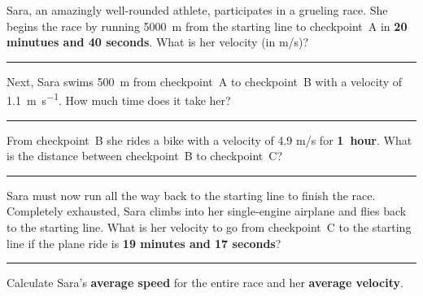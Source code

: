 \documentclass[12pt]{exam}
\begin{document}
\def\mystrut{\protect\rule[-2.2ex]{0ex}{2.2ex}} 
\qformat{ \textbf{Task \#\thequestion}
  \ifthenelse{\equal{\thequestion}{\thequestiontitle}}
    {}
    {: \emph{\thequestiontitle}}
  \mystrut  \hfill}
\begin{questions}

  \Large

  \question 
    Sara, an amazingly well-rounded athlete, participates in a grueling race.  She begins the race by running 5000~m from the starting line to checkpoint~A in {\bf 20 minutues and 40 seconds}.  What is her velocity (in m/s)?
    \vs\hrule\vs
  \question
    Next, Sara swims \SI{500}{\meter} from checkpoint~A to checkpoint~B with a velocity of \SI{1.1}{\meter\per\second}.  How much time does it take her?
    \vs\hrule\vs
  \question
    From checkpoint~B she rides a bike with a velocity of 4.9 m/s for {\bf 1~hour}.  What is the distance between checkpoint~B to checkpoint~C?
    \vs\hrule\vs
  \question
    Sara must now run all the way back to the starting line to finish the race.  Completely exhausted, Sara climbs into her single-engine airplane and flies back to the starting line.  What is her velocity to go from checkpoint~C to the starting line if the plane ride is {\bf 19 minutes and 17 seconds}?
    \vs\hrule\vs
  \question
    Calculate Sara's {\bf average speed} for the entire race and her {\bf average velocity}.
 \end{questions}
\end{document}
